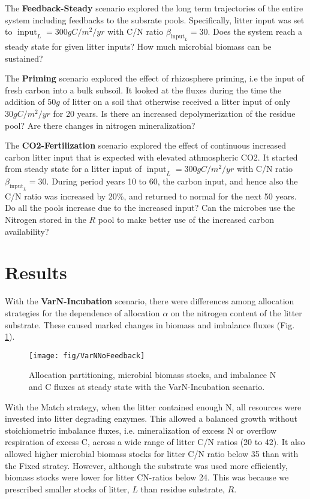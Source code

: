 The \textbf{Feedback-Steady} scenario explored the long term trajectories of
the entire system including feedbacks to the subsrate pools. Specifically, litter
input was set to $\operatorname{input}_L = 300 gC/m^2/yr$ with C/N ratio
$\beta_{\operatorname{input}_L} = 30$. Does the system reach a steady state for
given litter inputs? How much microbial biomass can be sustained?

The \textbf{Priming} scenario explored the effect of rhizosphere priming, i.e
the input of fresh carbon into a bulk subsoil. It looked at the fluxes during
the time the addition of $50 g$ of litter on a soil that otherwise
received a litter input of only $30 gC/m^2/yr$ for 20 years. Is
there an increased depolymerization of the residue pool? Are there changes in nitrogen
mineralization?

The \textbf{CO2-Fertilization} scenario explored the effect of continuous 
increased carbon litter input that is expected with elevated athmospheric CO2.
It started from steady state for a litter input of $\operatorname{input}_L = 300
gC/m^2/yr$ with C/N ratio $\beta_{\operatorname{input}_L} = 30$. During period
years 10 to 60, the carbon input, and hence also the C/N ratio was increased by
20\%, and returned to normal for the next 50 years. Do all the pools increase
due to the increased input? Can the microbes use the Nitrogen stored in the $R$
pool to make better use of the increased carbon availability?

\section{Results}

With the \textbf{VarN-Incubation} scenario, there were differences among
allocation strategies for the dependence of allocation $\alpha$ on the nitrogen
content of the litter substrate. These caused marked changes in
biomass and imbalance fluxes (Fig.
\ref{fig:VarNNoFeedback}).

\begin{figure}[t]
\vspace*{2mm}
\begin{center}
\texttt{[image: fig/VarNNoFeedback]}
\end{center}
\caption{Allocation partitioning,
microbial biomass stocks, and imbalance N and C
fluxes at steady state with the VarN-Incubation scenario.
\label{fig:VarNNoFeedback}}
\end{figure}

With the Match strategy, when the litter contained enough N, all resources were
invested into litter degrading enzymes. This allowed a balanced growth without
stoichiometric imbalance fluxes, i.e. mineralization of excess N or overflow
respiration of excess C, across a wide range of litter C/N
ratios (20 to 42).
It also allowed higher microbial biomass stocks for litter C/N ratio below
35 than with the Fixed stratey. However, although the
substrate was used more efficiently, biomass stocks were lower for litter
CN-ratios below 24. This was because we prescribed smaller stocks of litter,
$L$ than residue substrate, $R$.


